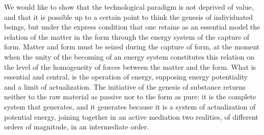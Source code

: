 \documentclass[a4paper]{article}
\begin{document}
We would like to show that the technological paradigm is not deprived of value, and that it is possible up to a certain point to think the genesis of individuated beings, but under the express condition that one retains as an essential model the relation of the matter in the form through the energy system of the capture of form. Matter and form must be seized during the capture of form, at the moment when the unity of the becoming of an energy system constitutes this relation on the level of the homogeneity of forces between the matter and the form. What is essential and central, is the operation of energy, supposing energy potentiality and a limit of actualization. The initiative of the genesis of substance returns neither to the raw material as passive nor to the form as pure: it is the complete system that generates, and it generates because it is a system of actualization of potential energy, joining together in an active mediation two realities, of different orders of magnitude, in an intermediate order.
\end{document}

